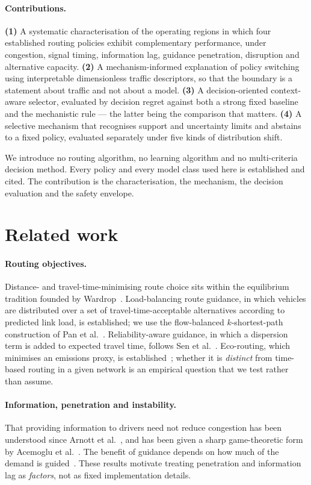 \paragraph{Contributions.}
\textbf{(1)} A systematic characterisation of the operating regions in which
four established routing policies exhibit complementary performance, under
congestion, signal timing, information lag, guidance penetration, disruption
and alternative capacity.
\textbf{(2)} A mechanism-informed explanation of policy switching using
interpretable dimensionless traffic descriptors, so that the boundary is a
statement about traffic and not about a model.
\textbf{(3)} A decision-oriented context-aware selector, evaluated by decision
regret against both a strong fixed baseline and the mechanistic rule --- the
latter being the comparison that matters.
\textbf{(4)} A selective mechanism that recognises support and uncertainty
limits and abstains to a fixed policy, evaluated separately under five kinds of
distribution shift.

We introduce no routing algorithm, no learning algorithm and no multi-criteria
decision method. Every policy and every model class used here is established
and cited. The contribution is the characterisation, the mechanism, the
decision evaluation and the safety envelope.

\section{Related work}

\paragraph{Routing objectives.} Distance- and travel-time-minimising route
choice sits within the equilibrium tradition founded by
Wardrop~\cite{wardrop1952}. Load-balancing route guidance, in which vehicles
are distributed over a set of travel-time-acceptable alternatives according to
predicted link load, is established; we use the flow-balanced $k$-shortest-path
construction of Pan et al.~\cite{pan2013proactive}. Reliability-aware guidance,
in which a dispersion term is added to expected travel time, follows
Sen et al.~\cite{sen2001meanvariance}. Eco-routing, which minimises an
emissions proxy, is established~\cite{boriboonsomsin2012eco}; whether it is
\emph{distinct} from time-based routing in a given network is an empirical
question that we test rather than assume.

\paragraph{Information, penetration and instability.} That providing
information to drivers need not reduce congestion has been understood since
Arnott et al.~\cite{arnott1991information}, and has been given a sharp
game-theoretic form by Acemoglu et al.~\cite{acemoglu2018braess}. The benefit
of guidance depends on how much of the demand is guided~\cite{yang1998penetration}.
These results motivate treating penetration and information lag as
\emph{factors}, not as fixed implementation details.

